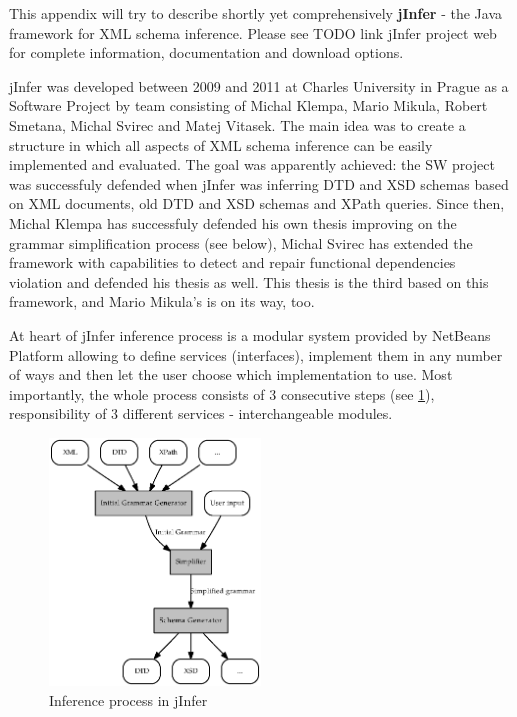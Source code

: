\documentclass[a4paper,12pt,oneside]{report}
\begin{document}
This appendix will try to describe shortly yet comprehensively \textbf{jInfer} - the Java framework for XML schema inference. Please see TODO link jInfer project web for complete information, documentation and download options.

jInfer was developed between 2009 and 2011 at Charles University in Prague as a Software Project by team consisting of Michal Klempa, Mario Mikula, Robert Smetana, Michal Svirec and Matej Vitasek. The main idea was to create a structure in which all aspects of XML schema inference can be easily implemented and evaluated. The goal was apparently achieved: the SW project was successfuly defended when jInfer was inferring DTD and XSD schemas based on XML documents, old DTD and XSD schemas and XPath queries. Since then, Michal Klempa has successfuly defended his own thesis improving on the grammar simplification process (see below), Michal Svirec has extended the framework with capabilities to detect and repair functional dependencies violation and defended his thesis as well. This thesis is the third based on this framework, and Mario Mikula's is on its way, too.

At heart of jInfer inference process is a modular system provided by NetBeans Platform allowing to define services (interfaces), implement them in any number of ways and then let the user choose which implementation to use. Most importantly, the whole process consists of 3 consecutive steps (see \ref{image-inference-process}), responsibility of 3 different services - interchangeable modules.

\begin{figure}
  \caption{Inference process in jInfer}
  \label{image-inference-process}
  \centering
    \includegraphics[width=0.5\textwidth]{images/inference-process.eps}
\end{figure}
\end{document}
